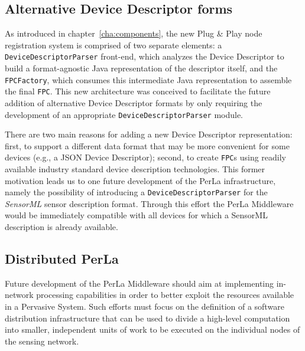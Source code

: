 \subsection{Alternative Device Descriptor forms}

As introduced in chapter~\ref{cha:components}, the new Plug \& Play node
registration system is comprised of two separate elements: a
\texttt{DeviceDescriptorParser} front-end, which analyzes the Device Descriptor
to build a format-agnostic Java representation of the descriptor itself, and
the \texttt{FPCFactory}, which consumes this intermediate Java representation
to assemble the final \texttt{FPC}. This new architecture was conceived to
facilitate the future addition of alternative Device Descriptor formats by only
requiring the development of an appropriate \texttt{DeviceDescriptorParser}
module.

There are two main reasons for adding a new Device Descriptor representation:
first, to support a different data format that may be more convenient for some
devices (e.g., a JSON Device Descriptor); second, to create \texttt{FPC}s using
readily available industry standard device description technologies. This
former motivation leads us to one future development of the PerLa
infrastructure, namely the possibility of introducing a
\texttt{DeviceDescriptorParser} for the \textit{SensorML} \cite{sensorml}
sensor description format. Through this effort the PerLa Middleware would be
immediately compatible with all devices for which a SensorML description is
already available.

\subsection{Distributed PerLa}

Future development of the PerLa Middleware should aim at implementing
in-network processing capabilities in order to better exploit the resources
available in a Pervasive System. Such efforts must focus on the definition of a
software distribution infrastructure that can be used to divide a high-level
computation into smaller, independent units of work to be executed on the
individual nodes of the sensing network.
